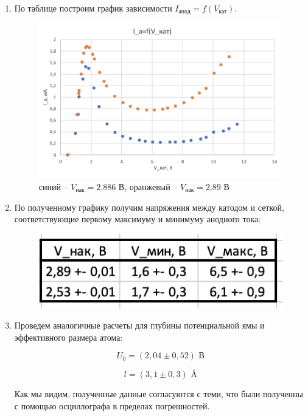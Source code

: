 \documentclass[a4paper, 12pt]{article}%
\begin{document}
\begin{enumerate}
\newpage

\item По таблице построим график зависимости $I_{\text{анод}} = f(V_{\text{кат}})$.

	\begin{figure}[h!]
		\centering
		\includegraphics[scale=0.8]{График_2.PNG}
		\caption{синий -- $V_{\text{нак}} = 2.886$ В,  оранжевый -- $V_{\text{нак}} = 2.89$ В}
	\end{figure}

\item По полученному графику получим напряжения между катодом и сеткой, соответствующие первому максимуму и минимуму анодного тока:

	\begin{figure}[h!]
		\centering
		\includegraphics[scale=0.8]{Таблица_4.PNG}
	\end{figure}	


\item Проведем аналогичные расчеты для глубины потенциальной ямы и эффективного размера атома:

\[ U_0 = (2,04 \pm 0,52) \text{ В} \]

\[ l = (3,1 \pm 0,3) \text{ \AA } \]

Как мы видим, полученные данные согласуются с теми, что были полученны с помощью осциллографа в пределах погрешностей.


\end{enumerate}
\end{document}
